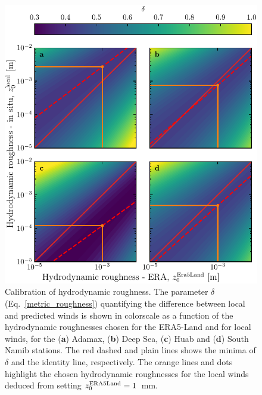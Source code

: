 \begin{figure}[p]
\centering
\includegraphics[scale=1]{Figures/Figure3_supp.pdf}
\caption{Calibration of hydrodynamic roughness. The parameter $\delta$ (Eq.~\ref{metric_roughness}) quantifying the difference between local and predicted winds is shown in colorscale as a function of the hydrodynamic roughnesses chosen for the ERA5-Land and for local winds, for the (\textbf{a}) Adamax, (\textbf{b}) Deep Sea, (\textbf{c}) Huab and (\textbf{d}) South Namib stations. The red dashed and plain lines shows the minima of $\delta$ and the identity line, respectively. The orange lines and dots highlight the chosen hydrodynamic roughnesses for the local winds deduced from setting $z_{0}^{\textup{ERA5Land}} = 1$~mm.}
\label{Fig3_supp}
\end{figure}


